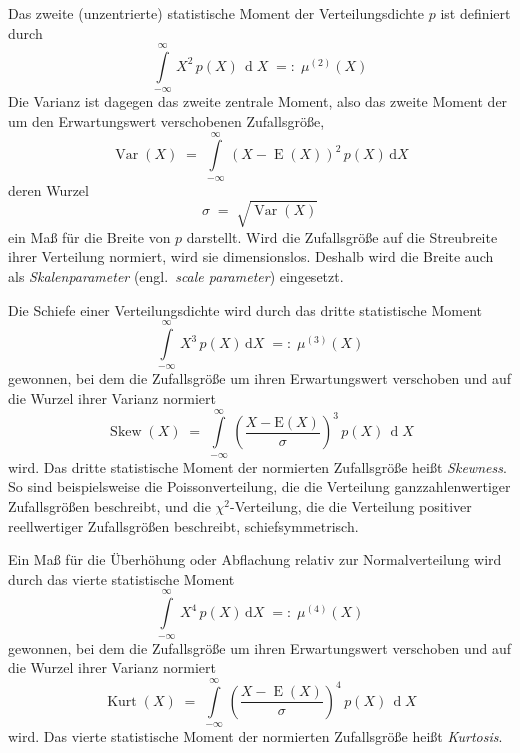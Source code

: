 Das zweite (unzentrierte) statistische Moment der Verteilungsdichte $p$ ist definiert durch
\begin{equation}
\int\limits_{-\infty}^{\infty} \, X^2 \, p(X) \, \operatorname{d} X \; =: \; \mu^{(2)}(X)
\end{equation}
Die Varianz ist dagegen das zweite zentrale Moment, also das zweite Moment der um den
Erwartungswert verschobenen Zufallsgröße,
\begin{equation}
\operatorname{Var}(X) \; = \; \int\limits_{-\infty}^{\infty} \, (X - \operatorname{E}(X))^2 \,
 p(X) \, \mathrm{d} X
\end{equation}
deren Wurzel
\begin{equation}
\sigma \; = \; \sqrt{\operatorname{Var}(X)}
\end{equation}
ein Maß für die Breite von $p$ darstellt. Wird die Zufallsgröße auf die Streubreite ihrer
Verteilung normiert, wird sie dimensionslos. Deshalb wird die Breite auch als \textsl{Skalenparameter}
(engl.\ \textsl{scale parameter}) eingesetzt.

Die Schiefe einer Verteilungsdichte wird durch das dritte statistische Moment
\begin{equation}
\int\limits_{-\infty}^{\infty} \, X^3 \, p(X) \, \mathrm{d} X \; =: \; \mu^{(3)}(X)
\end{equation}
gewonnen, bei dem die Zufallsgröße um ihren Erwartungswert verschoben und auf die Wurzel ihrer
Varianz normiert
\begin{equation}
\operatorname{Skew}(X) \; = \; \int\limits_{-\infty}^{\infty} \, \left(\frac{X - \mathrm{E}(X)}{\sigma}
\right)^3 \, p(X) \, \operatorname{d} X
\end{equation}
wird. Das dritte statistische Moment der normierten Zufallsgröße heißt
\textsl{Skewness}.
So sind beispielsweise die Poissonverteilung, die die Verteilung ganzzahlenwertiger Zufallsgrößen beschreibt,
und die $\chi^2$-Verteilung, die die Verteilung positiver reellwertiger Zufallsgrößen beschreibt,
schiefsymmetrisch.

Ein Maß für die Überhöhung oder Abflachung relativ zur Normalverteilung wird durch
das vierte statistische Moment
\begin{equation}
\int\limits_{-\infty}^{\infty} \, X^4 \, p(X) \, \mathrm{d} X \; =: \; \mu^{(4)}(X)
\end{equation}
gewonnen, bei dem die Zufallsgröße um ihren Erwartungswert verschoben und auf die Wurzel ihrer
Varianz normiert
\begin{equation}
\operatorname{Kurt}(X) \; = \;  \int\limits_{-\infty}^{\infty} \, \left(\frac{X - \operatorname{E}(X)}{\sigma}
\right)^4 \, p(X) \, \operatorname{d} X
\end{equation}
wird. Das vierte statistische Moment der normierten Zufallsgröße heißt
\textsl{Kurtosis}.

